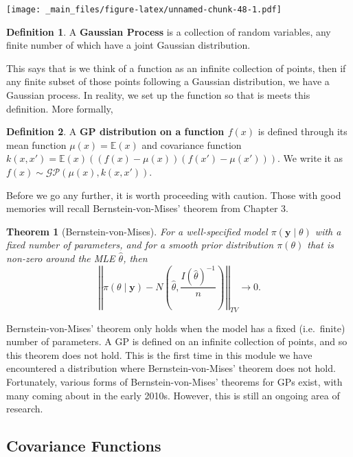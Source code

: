 \documentclass[
]{book}
\newtheorem{theorem}{Theorem}[chapter]
\theoremstyle{definition}
\newtheorem{definition}{Definition}[chapter]
\theoremstyle{definition}
\theoremstyle{definition}
\theoremstyle{definition}
\theoremstyle{remark}
\begin{document}
\texttt{[image: \_main\_files/figure-latex/unnamed-chunk-48-1.pdf]}

\begin{definition}
A \textbf{Gaussian Process} is a collection of random variables, any finite number of which have a joint Gaussian distribution.
\end{definition}

This says that is we think of a function as an infinite collection of points, then if any finite subset of those points following a Gaussian distribution, we have a Gaussian process. In reality, we set up the function so that is meets this definition. More formally,

\begin{definition}
A \textbf{GP distribution on a function \(f(x)\)} is defined through its mean function \(\mu(x) = \mathbb{E}(x)\) and covariance function \(k(x, x') = \mathbb{E}(x)\left((f(x) - \mu(x))(f(x') - \mu(x'))\right)\). We write it as \(f(x) \sim \mathcal{GP}(\mu(x), k(x, x'))\).
\end{definition}

Before we go any further, it is worth proceeding with caution. Those with good memories will recall Bernstein-von-Mises' theorem from Chapter 3.

\begin{theorem}[Bernstein-von-Mises]
For a well-specified model \(\pi(\boldsymbol{y} \mid \theta)\) with a fixed number of parameters, and for a smooth prior distribution \(\pi(\theta)\) that is non-zero around the MLE \(\hat{\theta}\), then
\[
\left|\left| \pi(\theta \mid \boldsymbol{y}) - N\left(\hat{\theta}, \frac{I(\hat{\theta})^{-1}}{n}\right) \right|\right|_{TV} \rightarrow 0.
\]
\end{theorem}

Bernstein-von-Mises' theorem only holds when the model has a fixed (i.e.~finite) number of parameters. A GP is defined on an infinite collection of points, and so this theorem does not hold. This is the first time in this module we have encountered a distribution where Bernstein-von-Mises' theorem does not hold. Fortunately, various forms of Bernstein-von-Mises' theorems for GPs exist, with many coming about in the early 2010s. However, this is still an ongoing area of research.

\hypertarget{covariance-functions}{%
\subsection{Covariance Functions}\label{covariance-functions}}
\end{document}

